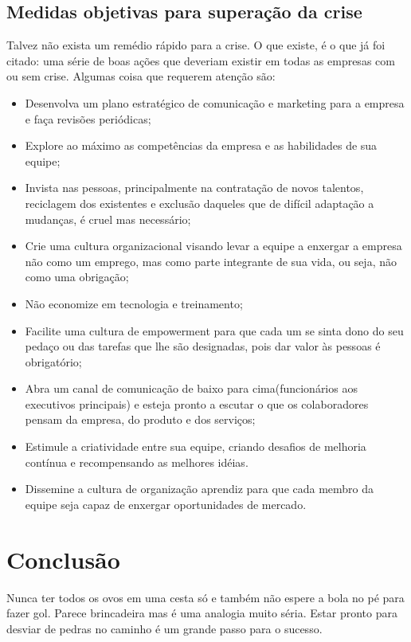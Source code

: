 \documentclass[11pt]{article}
\begin{document}
\subsection{Medidas objetivas para superação da crise}	

Talvez não exista um remédio rápido para a crise. O que existe, é o que já foi citado: uma série de boas ações que deveriam existir em todas as empresas com ou sem crise.
Algumas coisa que requerem atenção são:
\begin{itemize}
	\item Desenvolva um plano estratégico de comunicação e marketing para a empresa e faça revisões periódicas;
	\item Explore ao máximo as competências da empresa e as habilidades de sua equipe;
	\item Invista nas pessoas, principalmente na contratação de novos talentos, reciclagem dos existentes e exclusão daqueles que de difícil adaptação a mudanças, é cruel mas necessário;
	\item Crie uma cultura organizacional visando levar a equipe a enxergar a empresa não como um emprego, mas como parte integrante de sua vida, ou seja, não como uma obrigação;
	\item Não economize em tecnologia e treinamento;
	\item Facilite uma cultura de empowerment para que cada um se sinta dono do seu pedaço ou das tarefas que lhe são designadas, pois dar valor às pessoas é obrigatório;
	\item Abra um canal de comunicação de baixo para cima(funcionários aos executivos principais) e esteja pronto a escutar o que os colaboradores pensam da empresa, do produto e dos serviços;
	\item Estimule a criatividade entre sua equipe, criando desafios de melhoria contínua e recompensando as melhores idéias.
	\item Dissemine a cultura de organização aprendiz para que cada membro da equipe seja capaz de enxergar oportunidades de mercado.
\end{itemize}

\section{Conclusão}

Nunca ter todos os ovos em uma cesta só e também não espere a bola no pé para fazer gol. Parece brincadeira mas é uma analogia muito séria. Estar pronto para desviar de pedras no caminho é um grande passo para o sucesso. 
\end{document}
